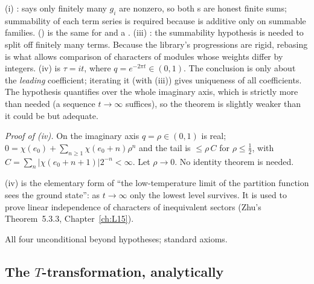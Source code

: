 \begin{dictionary}
(i) :  says only finitely many $g_i$ are nonzero, so both
s are honest finite sums; summability of each term series is required because  is additive only on
summable families.  () is the same for  and a
. (iii) : the summability hypothesis is needed to split off finitely many terms. Because the
library's progressions are rigid, rebasing is what allows comparison of characters of modules whose weights differ by
integers. (iv)  is $\tau = it$, where $q = e^{-2\pi t}\in(0,1)$. The conclusion is only about the
\emph{leading} coefficient; iterating it (with (iii)) gives uniqueness of all coefficients. The hypothesis 
quantifies over the whole imaginary axis, which is strictly more than needed (a sequence $t\to\infty$ suffices), so the
theorem is slightly weaker than it could be but adequate.
\end{dictionary}
\noindent\emph{Proof of (iv).} On the imaginary axis $q = \rho\in(0,1)$ is real; $0 = \chi(e_0) + \sum_{n\ge1}\chi(e_0+n)\rho^n$
and the tail is $\le\rho\,C$ for $\rho\le\frac12$, with $C = \sum_n|\chi(e_0+n+1)|2^{-n}<\infty$. Let $\rho\to0$. No identity
theorem is needed.
\begin{physics}
(iv) is the elementary form of ``the low-temperature limit of the partition function sees the ground state'': as $t\to\infty$
only the lowest level survives. It is used to prove linear independence of characters of inequivalent sectors (Zhu's
Theorem~5.3.3, Chapter~\ref{ch:L15}).
\end{physics}
\begin{status}
All four unconditional beyond hypotheses; standard axioms.
\end{status}

\subsection{The \texorpdfstring{$T$}{T}-transformation, analytically}

